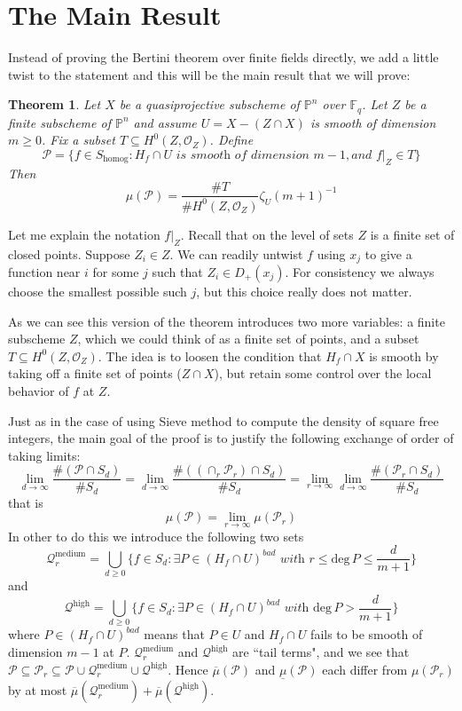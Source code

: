 \documentclass[12pt]{article}
\theoremstyle{plain}
\newtheorem{theorem}[equation]{Theorem}
\theoremstyle{definition}
\newcommand{\IF}{\mathbb{F}}
\newcommand{\IP}{\mathbb{P}}
\newcommand{\sO}{\mathcal{O}}
\newcommand{\sP}{\mathcal{P}}
\renewcommand{\deg}{\mathrm{deg}\,}
\newcommand\union{\bigcup}
\newcommand{\<}{\langle}
\renewcommand{\>}{\rangle}
\newcommand{\Qmed}{\mathcal{Q}_r^\mathrm{medium}}
\newcommand{\Qhigh}{\mathcal{Q}^\mathrm{high}}
\newcommand{\uppermu}{\overline{\mu}}
\newcommand{\lowermu}{\underline{\mu}}
\begin{document}
\section{The Main Result}
Instead of proving the Bertini theorem over finite fields directly, we add a little twist to the statement and this will be the main result that we will prove:
\begin{theorem}
\label{main}
Let $X$ be a quasiprojective subscheme of $\IP^n$ over $\IF_q$. Let $Z$ be a finite subscheme of $\IP^n$ and assume $U = X - (Z \cap X)$ is smooth of dimension $m\ge 0$. Fix a subset $T \subseteq H^0(Z, \sO_Z)$. Define 
$$ \sP = \{ f \in S_{\mathrm{homog}} : H_f \cap U \textit{ is smooth of dimension }m-1, \textit{and }f|_Z \in T\}$$
Then 
$$ \mu(\sP) = \frac{\# T}{\# H^0(Z, \sO_Z)} \zeta_U(m + 1)^{-1} $$
\end{theorem}
Let me explain the notation $f|_Z$. Recall that on the level of sets $Z$ is a finite set of closed points. Suppose $Z_i \in Z$. We can readily untwist $f$ using $x_j$ to give a function near $i$ for some $j$ such that $Z_i \in D_+(x_j)$. For consistency we always choose the smallest possible such $j$, but this choice really does not matter. 
\par As we can see this version of the theorem introduces two more variables: a finite subscheme $Z$, which we could think of as a finite set of points, and a subset $T \subseteq H^0(Z, \sO_Z)$. The idea is to loosen the condition that $H_f \cap X$ is smooth by taking off a finite set of points ($Z \cap X$), but retain some control over the local behavior of $f$ at $Z$. 
\par Just as in the case of using Sieve method to compute the density of square free integers, the main goal of the proof is to justify the following exchange of order of taking limits: 
$$\lim_{d \to \infty} \frac{\#(\sP \cap S_d)}{\# S_d} = \lim_{d \to \infty} \frac{\#((\cap_r \sP_r) \cap S_d)}{\# S_d} = \lim_{r \to \infty} \lim_{d \to \infty} \frac{\#(\sP_r \cap S_d)}{\# S_d}$$ that is 
$$ \mu(\sP) = \lim_{r \to \infty} \mu(\sP_r)$$
In other to do this we introduce the following two sets
$$\Qmed = \union_{d \ge 0} \{ f \in S_d : \textit{$\exists P \in (H_f \cap U)^{bad}$ with } r \le \deg P \le \frac{d}{m+1}\}$$
and 
$$\Qhigh = \union_{d \ge 0} \{ f \in S_d : \exists P \in (H_f \cap U)^{bad} \textit{ with } \deg P > \frac{d}{m+1} \}$$
where $P \in (H_f \cap U)^{bad}$ means that $P \in U$ and $H_f \cap U$ fails to be smooth of dimension $m - 1$ at $P$. $\Qmed$ and $\Qhigh$ are ``tail terms", and we see that $\sP \subseteq \sP_r \subseteq \sP \cup \Qmed \cup \Qhigh$. Hence $\uppermu(\sP)$ and $\lowermu(\sP)$ each differ from $\mu(\sP_r)$ by at most $\uppermu(\Qmed) + \uppermu(\Qhigh)$. 
\end{document}
